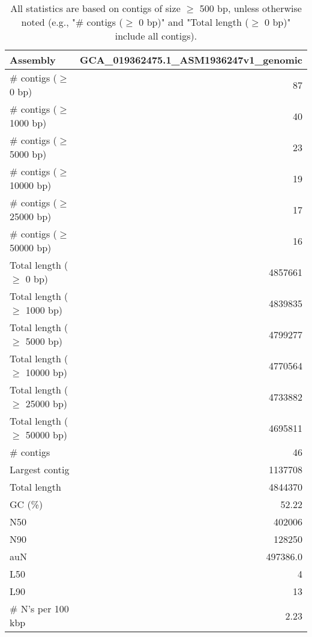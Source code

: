 \documentclass[12pt,a4paper]{article}
\begin{document}
\begin{table}[ht]
\begin{center}
\caption{All statistics are based on contigs of size $\geq$ 500 bp, unless otherwise noted (e.g., "\# contigs ($\geq$ 0 bp)" and "Total length ($\geq$ 0 bp)" include all contigs).}
\begin{tabular}{|l*{1}{|r}|}
\hline
Assembly & GCA\_019362475.1\_ASM1936247v1\_genomic \\ \hline
\# contigs ($\geq$ 0 bp) & 87 \\ \hline
\# contigs ($\geq$ 1000 bp) & 40 \\ \hline
\# contigs ($\geq$ 5000 bp) & 23 \\ \hline
\# contigs ($\geq$ 10000 bp) & 19 \\ \hline
\# contigs ($\geq$ 25000 bp) & 17 \\ \hline
\# contigs ($\geq$ 50000 bp) & 16 \\ \hline
Total length ($\geq$ 0 bp) & 4857661 \\ \hline
Total length ($\geq$ 1000 bp) & 4839835 \\ \hline
Total length ($\geq$ 5000 bp) & 4799277 \\ \hline
Total length ($\geq$ 10000 bp) & 4770564 \\ \hline
Total length ($\geq$ 25000 bp) & 4733882 \\ \hline
Total length ($\geq$ 50000 bp) & 4695811 \\ \hline
\# contigs & 46 \\ \hline
Largest contig & 1137708 \\ \hline
Total length & 4844370 \\ \hline
GC (\%) & 52.22 \\ \hline
N50 & 402006 \\ \hline
N90 & 128250 \\ \hline
auN & 497386.0 \\ \hline
L50 & 4 \\ \hline
L90 & 13 \\ \hline
\# N's per 100 kbp & 2.23 \\ \hline
\end{tabular}
\end{center}
\end{table}
\end{document}
